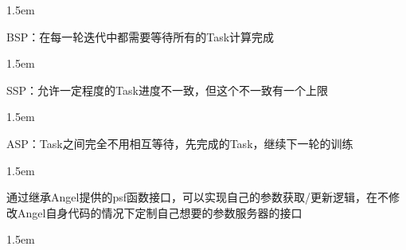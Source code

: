 \documentclass{article}
\begin{document}
\begin{mddefinitions}%


\begin{mdbmarginx}{}{}{}{1.5em}%
\begin{mddefdata}%

BSP：在每一轮迭代中都需要等待所有的Task计算完成%
\end{mddefdata}%
\end{mdbmarginx}%

\begin{mdbmarginx}{}{}{}{1.5em}%
\begin{mddefdata}%

SSP：允许一定程度的Task进度不一致，但这个不一致有一个上限%
\end{mddefdata}%
\end{mdbmarginx}%

\begin{mdbmarginx}{}{}{}{1.5em}%
\begin{mddefdata}%

ASP：Task之间完全不用相互等待，先完成的Task，继续下一轮的训练%
\end{mddefdata}%
\end{mdbmarginx}%


\begin{mdbmarginx}{}{}{}{1.5em}%
\begin{mddefdata}%

通过继承Angel提供的psf函数接口，可以实现自己的参数获取/更新逻辑，在不修改Angel自身代码的情况下定制自己想要的参数服务器的接口%
\end{mddefdata}%
\end{mdbmarginx}%

\begin{mdbmarginx}{}{}{}{1.5em}%
\begin{mddefdata}%
\end{mddefdata}%
\end{mdbmarginx}%
\end{mddefinitions}%
\end{document}
